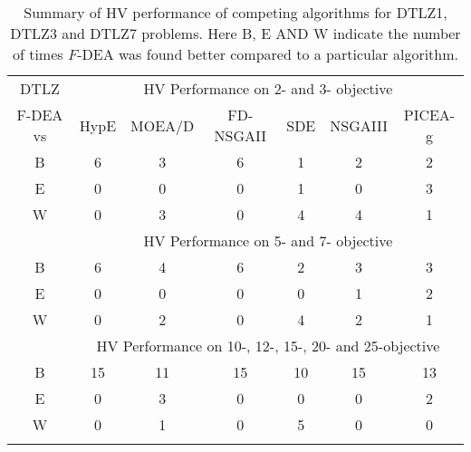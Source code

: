 \begin{table}[htbp]
\centering
\caption{Summary of HV performance of competing algorithms for DTLZ1, DTLZ3 and DTLZ7 problems. Here B, E AND W indicate the number of times  $F$-DEA was found better compared to a particular algorithm.}

\label{table:dtlzhvsummary}

\renewcommand{\arraystretch}{1.1}
\begin{adjustbox}{width=0.50\textwidth,center}
\begin{tabular}{c|cccccc}
\thickhline
DTLZ & \multicolumn{6}{c}{HV Performance on 2-  and 3- objective} \\\thickhline
F-DEA vs & HypE & MOEA/D & FD-NSGAII & SDE & NSGAIII & PICEA-g \\\thickhline
B & 6 & 3 & 6 & 1 & 2 & 2 \\
E & 0 & 0 & 0 & 1 & 0 & 3 \\
W & 0 & 3 & 0 & 4 & 4 & 1 \\\thickhline
 & \multicolumn{6}{c}{HV Performance on 5- and 7- objective} \\\thickhline
B & 6 & 4 & 6 & 2 & 3 & 3 \\
E & 0 & 0 & 0 & 0 & 1 & 2 \\
W & 0 & 2 & 0 & 4 & 2 & 1 \\\thickhline
 & \multicolumn{6}{c}{HV Performance on 10-, 12-, 15-, 20- and 25-objective} \\\thickhline
B & 15 & 11 & 15 & 10 & 15 & 13 \\
E & 0  & 3  & 0  & 0  & 0  & 2  \\
W & 0  & 1  & 0  & 5  & 0  & 0\\\thickhline
\end{tabular}
\end{adjustbox}
\end{table}

